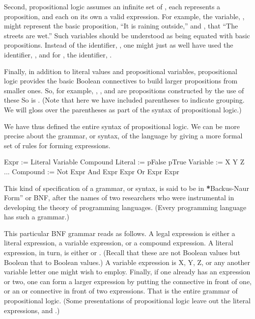 \documentclass[letterpaper,10pt,english]{sphinxmanual}
\begin{document}
Second, propositional logic assumes an infinite set of , each represents a proposition, and each on its own a valid
expression. For example, the variable, , might represent the basic
proposition, “It is raining outside,” and , that “The streets are
wet.”  Such variables should be understood as being equated with basic
propositions. Instead of the identifier, , one might just as well
have used the identifier, , and for , the
identifier, .

Finally, in addition to literal values and propositional variables,
propositional logic provides the basic Boolean connectives to build
larger propositions from smaller ones. So, for example, , , and  are propositions constructed by the use of these
 So is . (Note that here
we have included parentheses to indicate grouping. We will gloss over
the parentheses as part of the syntax of propositional logic.)

We have thus defined the entire syntax of propositional logic. We
can be more precise about the grammar, or syntax, of the language by
giving a more formal set of rules for forming expressions.

\begin{sphinxVerbatim}[commandchars=\\\{\}]
Expr       := Literal \textbar{} Variable \textbar{} Compound
Literal    := pFalse \textbar{} pTrue
Variable   := X \textbar{} Y \textbar{} Z \textbar{} ...
Compound   := Not Expr \textbar{} And Expr Expr \textbar{} Or Expr Expr
\end{sphinxVerbatim}

This kind of specification of a grammar, or syntax, is said to be in
{\color{red}\bfseries{}*}Backus-Naur Form” or BNF, after the names of two researchers who were
instrumental in developing the theory of programming languages. (Every
programming language has such a grammar.)

This particular BNF grammar reads as follows. A legal expression is
either a literal expression, a variable expression, or a compound
expression.  A literal expression, in turn, is either  or
. (Recall that these are not Boolean values but Boolean
 that  to Boolean values.)  A variable
expression is X, Y, Z, or any another variable letter one might wish
to employ. Finally, if one already has an expression or two, one can
form a larger expression by putting the  connective in front of
one, or an  or  connective in front of two expressions.  That
is the entire grammar of propositional logic. (Some presentations of
propositional logic leave out the literal expressions,  and
.)
\end{document}
